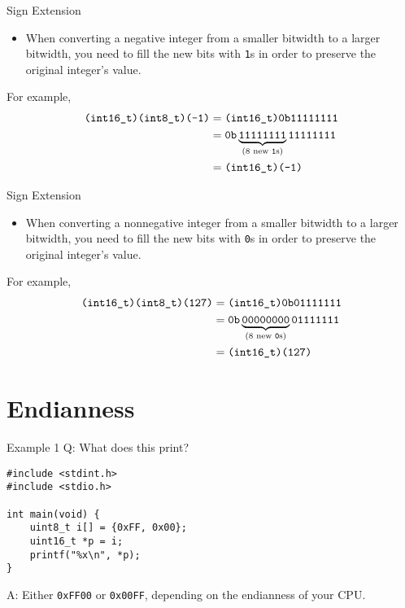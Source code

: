 \documentclass[hyphens,aspectratio=169,dvipsnames]{beamer}
\begin{document}
\begin{frame}{Sign Extension}
    \begin{itemize}
        \pause \item When converting a negative integer from a smaller bitwidth to a larger bitwidth, you need to fill the new bits with \texttt{1}s in order to preserve the original integer's value.
    \end{itemize}

    \pause For example,
    \begin{align*}
        \texttt{(int16\_t)(int8\_t)(-1)} &= \texttt{(int16\_t)0b11111111} \\
                                         &= \texttt{0b}\underbrace{\texttt{11111111}}_\text{(8 new \texttt{1}s)}\texttt{11111111} \\
                                         &= \texttt{(int16\_t)(-1)}
    \end{align*}
\end{frame}

\begin{frame}{Sign Extension}
    \begin{itemize}
        \pause \item When converting a nonnegative integer from a smaller bitwidth to a larger bitwidth, you need to fill the new bits with \texttt{0}s in order to preserve the original integer's value.
    \end{itemize}

    \pause For example,
    \begin{align*}
        \texttt{(int16\_t)(int8\_t)(127)} &= \texttt{(int16\_t)0b01111111} \\
                                          &= \texttt{0b}\underbrace{\texttt{00000000}}_\text{(8 new \texttt{0}s)}\texttt{01111111} \\
                                          &= \texttt{(int16\_t)(127)}
    \end{align*}
\end{frame}

\section{Endianness}

\begin{frame}[fragile]{Example 1}
    Q: What does this print?
    \begin{verbatim}
#include <stdint.h>
#include <stdio.h>

int main(void) {
    uint8_t i[] = {0xFF, 0x00};
    uint16_t *p = i;
    printf("%x\n", *p);
}
    \end{verbatim}

    \pause A: Either \texttt{0xFF00} or \texttt{0x00FF}, depending on the endianness of your CPU.
\end{frame}
\end{document}
